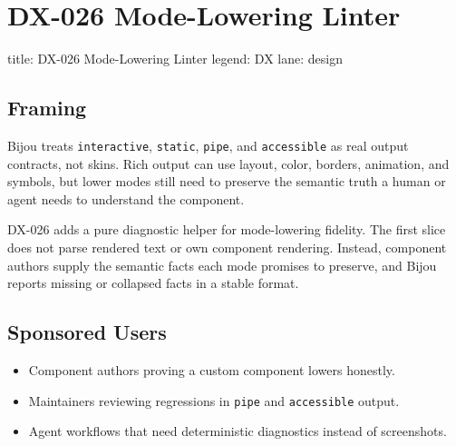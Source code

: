 \chapter{DX-026 Mode-Lowering Linter}\label{record-126}

\smallskip

\begin{RecordMeta}
title: DX-026 Mode-Lowering Linter
legend: DX
lane: design

\end{RecordMeta}

\section{Framing}\label{record-126-framing}

Bijou treats \texttt{i\allowbreak{}n\allowbreak{}t\allowbreak{}e\allowbreak{}r\allowbreak{}a\allowbreak{}c\allowbreak{}t\allowbreak{}i\allowbreak{}v\allowbreak{}e}, \texttt{s\allowbreak{}t\allowbreak{}a\allowbreak{}t\allowbreak{}i\allowbreak{}c}, \texttt{p\allowbreak{}i\allowbreak{}p\allowbreak{}e}, and \texttt{a\allowbreak{}c\allowbreak{}c\allowbreak{}e\allowbreak{}s\allowbreak{}s\allowbreak{}i\allowbreak{}b\allowbreak{}l\allowbreak{}e} as real output contracts, not skins. Rich output can use layout, color, borders, animation, and symbols, but lower modes still need to preserve the semantic truth a human or agent needs to understand the component.

DX-026 adds a pure diagnostic helper for mode-lowering fidelity. The first slice does not parse rendered text or own component rendering. Instead, component authors supply the semantic facts each mode promises to preserve, and Bijou reports missing or collapsed facts in a stable format.

\section{Sponsored Users}\label{record-126-sponsored-users}

\begin{itemize}
\tightlist
\item
  Component authors proving a custom component lowers honestly.
\item
  Maintainers reviewing regressions in \texttt{p\allowbreak{}i\allowbreak{}p\allowbreak{}e} and \texttt{a\allowbreak{}c\allowbreak{}c\allowbreak{}e\allowbreak{}s\allowbreak{}s\allowbreak{}i\allowbreak{}b\allowbreak{}l\allowbreak{}e} output.
\item
  Agent workflows that need deterministic diagnostics instead of screenshots.
\end{itemize}


